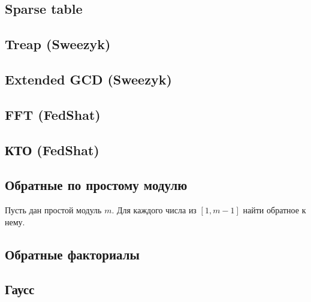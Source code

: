 \documentclass[a4paper]{article}
\begin{document}
\begin{multicols*}{2}
        \subsection{Sparse table}
            
        
        \subsection{Treap (Sweezyk)}
            
        
        \subsection{Extended GCD (Sweezyk)}
            
        
        \subsection{FFT (FedShat)}
            
        
        \subsection{КТО (FedShat)}
            
        
        \subsection{Обратные по простому модулю}
            Пусть дан простой модуль $m$. Для каждого числа из $[1, m - 1]$ найти обратное к нему.
            
        
        \subsection{Обратные факториалы}
            
        
        \subsection{Гаусс}
            
            

\end{multicols*}
\end{document}
